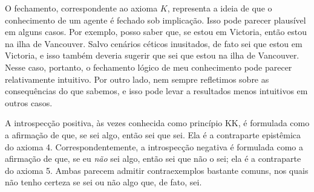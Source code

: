 \documentclass[../../../include/open-logic-section]{subfiles}
\begin{document}
O fechamento, correspondente ao axioma $K$, representa a ideia de que
o conhecimento de um agente é fechado sob implicação. Isso pode parecer
plausível em alguns casos. Por exemplo, posso saber que, se estou em
Victoria, então estou na ilha de Vancouver. Salvo cenários céticos
inusitados, de fato sei que estou em Victoria, e isso também deveria
sugerir que sei que estou na ilha de Vancouver. Nesse caso, portanto,
o fechamento lógico de meu conhecimento pode parecer relativamente
intuitivo. Por outro lado, nem sempre refletimos sobre as consequências
do que sabemos, e isso pode levar a resultados menos intuitivos em
outros casos.

A introspecção positiva, às vezes conhecida como princípio KK, é
formulada como a afirmação de que, se sei algo, então sei que sei. Ela
é a contraparte epistêmica do axioma 4. Correspondentemente, a
introspecção negativa é formulada como a afirmação de que, se eu
\emph{não} sei algo, então sei que não o sei; ela é a contraparte do
axioma 5. Ambas parecem admitir contraexemplos bastante comuns, nos
quais não tenho certeza se sei ou não algo que, de fato, sei. 
\end{document}
